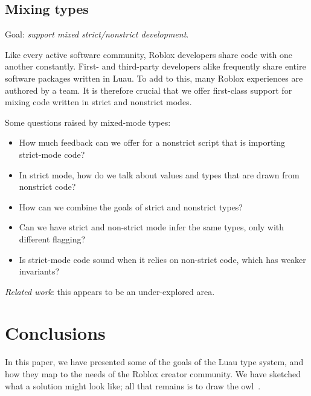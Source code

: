 \documentclass[acmsmall]{acmart}
\begin{document}
\subsection{Mixing types}

Goal: \emph{support mixed strict/nonstrict development}.

Like every active software community, Roblox developers share code
with one another constantly.  First- and third-party developers alike
frequently share entire software packages written in Luau.  To add to
this, many Roblox experiences are authored by a team.  It is therefore
crucial that we offer first-class support for mixing code written in
strict and nonstrict modes.

Some questions raised by mixed-mode types:
\begin{itemize}

\item How much feedback can we offer for a nonstrict script that is
  importing strict-mode code?

\item In strict mode, how do we talk about values and types that are
  drawn from nonstrict code?

\item How can we combine the goals of strict and nonstrict types?

\item Can we have strict and non-strict mode infer the same types,
  only with different flagging?

\item Is strict-mode code sound when it relies on non-strict code,
  which has weaker invariants?

\end{itemize}
\emph{Related work}: this appears to be an under-explored area.

\section{Conclusions}

In this paper, we have presented some of the goals of the Luau type
system, and how they map to the needs of the Roblox creator
community. We have sketched what a solution might look like; all that
remains is to draw the owl~\cite{HowToDrawAnOwl}.

 
\end{document}
